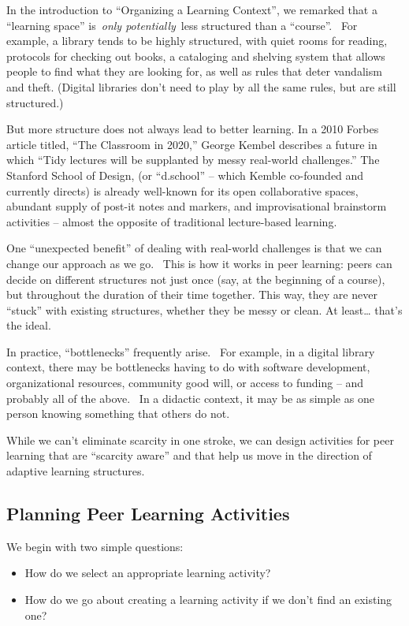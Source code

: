In the introduction to ``Organizing a Learning Context'', we remarked
that a ``learning space'' is~\emph{only potentially}~less structured
than a ``course''. ~For example, a library tends to be highly
structured, with quiet rooms for reading, protocols for checking out
books, a cataloging and shelving system that allows people to find what
they are looking for, as well as rules that deter vandalism and theft.
(Digital libraries don't need to play by all the same rules, but are
still structured.)

But more structure does not always lead to better learning. In a 2010
Forbes article titled, ``The Classroom in 2020,'' George Kembel
describes a future in which ``Tidy lectures will be supplanted by messy
real-world challenges.'' The Stanford School of Design, (or ``d.school''
-- which Kemble co-founded and currently directs) is already well-known
for its open collaborative spaces, abundant supply of post-it notes and
markers, and improvisational brainstorm activities -- almost the
opposite of traditional lecture-based learning.

One ``unexpected benefit'' of dealing with real-world challenges is that
we can change our approach as we go. ~This is how it works in peer
learning: peers can decide on different structures not just once (say,
at the beginning of a course), but throughout the duration of their time
together. This way, they are never ``stuck'' with existing structures,
whether they be messy or clean. At least\ldots{} that's the ideal.

In practice, ``bottlenecks'' frequently arise. ~For example, in a
digital library context, there may be bottlenecks having to do with
software development, organizational resources, community good will, or
access to funding -- and probably all of the above. ~In a didactic
context, it may be as simple as one person knowing something that others
do not.

While we can't eliminate scarcity in one stroke, we can design
activities for peer learning that are ``scarcity aware'' and that help
us move in the direction of adaptive learning structures.

\subsection{Planning Peer Learning Activities}

We begin with two simple questions:

\begin{itemize}
\itemsep1pt\parskip0pt
\item
  How do we select an appropriate learning activity?
\item
  How do we go about creating a learning activity if we don't find an
  existing one?
\end{itemize}

